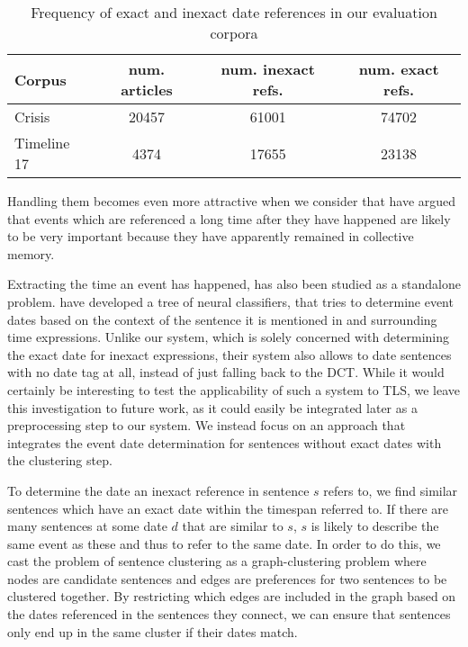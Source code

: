 \documentclass[a4paper,BCOR=10mm]{report}
\numberwithin{lemma}{chapter}
\numberwithin{definition}{chapter}
\begin{document}
\begin{table}
\begin{center}
\begin{tabular}{|l|c|c|c|}
\hline
\textbf{Corpus} & \textbf{num. articles} & \textbf{num. inexact refs.} & \textbf{num. exact refs.} \\\hline
Crisis & 20457 & 61001 & 74702 \\
Timeline 17 & 4374 & 17655 & 23138 \\\hline
\end{tabular}
\caption{Frequency of exact and inexact date references in our evaluation corpora}
\label{tab:ambigous-date-ref}
\end{center}
\end{table}


Handling them becomes even more attractive when we consider that \citet{tran-datesel} have argued that events which are referenced a long time after they have happened are likely to be very important because they have apparently remained in collective memory. %

Extracting the time an event has happened, has also been studied as a standalone problem. \citet{event-time-extraction} have developed a tree of neural classifiers, that tries to determine event dates based on the context of the sentence it is mentioned in and surrounding time expressions. Unlike our system, which is solely concerned with determining the exact date for inexact expressions, their system also allows to date sentences with no date tag at all, instead of just falling back to the DCT.
While it would certainly be interesting to test the applicability of such a system to TLS, we leave this investigation to future work, as it could easily be integrated later as a preprocessing step to our system.
We instead focus on an approach that integrates the event date determination for sentences without exact dates with the clustering step.

To determine the date an inexact reference in sentence $s$ refers to, we find similar sentences which have an exact date within the timespan referred to. If there are many sentences at some date $d$ that are similar to $s$, $s$ is likely to describe the same event as these and thus to refer to the same date. In order to do this, we cast the problem of sentence clustering as a graph-clustering problem where nodes are candidate sentences and edges are preferences for two sentences to be clustered together. By restricting which edges are included in the graph based on the dates referenced in the sentences they connect, we can ensure that sentences only end up in the same cluster if their dates match.
\end{document}
